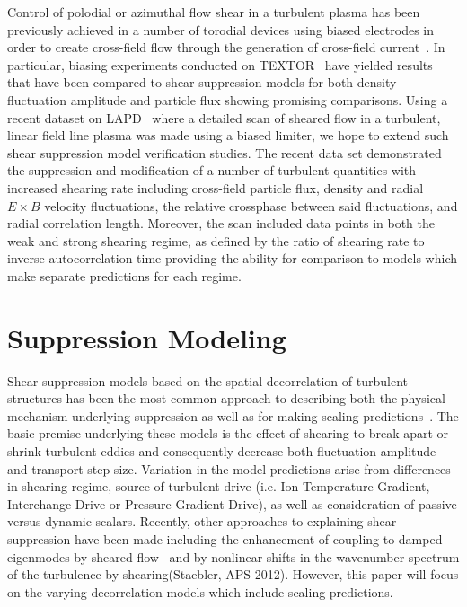 \documentclass[aip,pop,amsmath,amssymb,reprint,superscriptaddress]{revtex4-1} %
\begin{document}
Control of polodial or azimuthal flow shear in a turbulent plasma has been previously achieved in a number of torodial devices using biased electrodes in order to create cross-field flow through the generation of cross-field current~\cite{taylor89,weynants92}. In particular, biasing experiments conducted on TEXTOR~\cite{weynants98,boedo00,boedo02} have yielded results that have been compared to shear suppression models for both density fluctuation amplitude and particle flux showing promising comparisons. Using a recent dataset on LAPD~\cite{schaffner12} where a detailed scan of sheared flow in a turbulent, linear field line plasma was made using a biased limiter, we hope to extend such shear suppression model verification studies. The recent data set demonstrated the suppression and modification of a number of turbulent quantities with increased shearing rate including cross-field particle flux, density and radial $E\times B$ velocity fluctuations, the relative crossphase between said fluctuations, and radial correlation length. Moreover, the scan included data points in both the weak and strong shearing regime, as defined by the ratio of shearing rate to inverse autocorrelation time providing the ability for comparison to models which make separate predictions for each regime.

\section{Suppression Modeling}

Shear suppression models based on the spatial decorrelation of turbulent structures has been the most common approach to describing both the physical mechanism underlying suppression as well as for making scaling predictions~\cite{terry00}. The basic premise underlying these models is the effect of shearing to break apart or shrink turbulent eddies and consequently decrease both fluctuation amplitude and transport step size. Variation in the model predictions arise from differences in shearing regime, source of turbulent drive (i.e. Ion Temperature Gradient, Interchange Drive or Pressure-Gradient Drive), as well as consideration of passive versus dynamic scalars. Recently, other approaches to explaining shear suppression have been made including the enhancement of coupling to damped eigenmodes by sheared flow~\cite{terry06} and by nonlinear shifts in the wavenumber spectrum of the turbulence by shearing(Staebler, APS 2012). However, this paper will focus on the varying decorrelation models which include scaling predictions. 
\end{document}
